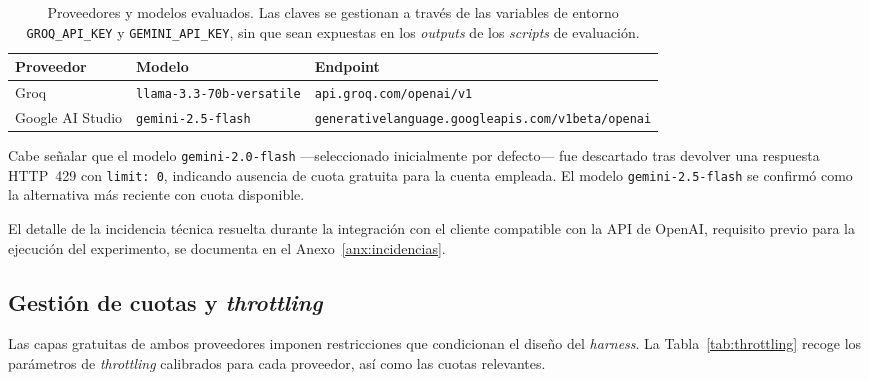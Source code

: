 \begin{table}[ht]
	\centering
	\small
	\begin{tabular}{llp{5.5cm}}
		\hline
		\textbf{Proveedor} & \textbf{Modelo}                  & \textbf{Endpoint}                                                                            \\
		\hline
		Groq               & \texttt{llama-3.3-70b-versatile} & \texttt{api.groq.com/openai/v1}                                                              \\
		Google AI Studio   & \texttt{gemini-2.5-flash}        & \texttt{generativelanguage.\allowbreak googleapis.com/\allowbreak v1beta/\allowbreak openai} \\
		\hline
	\end{tabular}
	\caption{Proveedores y modelos evaluados. Las claves se gestionan a través de
		las variables de entorno \texttt{GROQ\_API\_KEY} y \texttt{GEMINI\_API\_KEY},
		sin que sean expuestas en los \textit{outputs} de los \textit{scripts} de
		evaluación.}
	\label{tab:proveedores}
\end{table}

Cabe señalar que el modelo \texttt{gemini-2.0-flash} ---seleccionado inicialmente
por defecto--- fue descartado tras devolver una respuesta HTTP~429 con
\texttt{limit: 0}, indicando ausencia de cuota gratuita para la cuenta
empleada. El modelo \texttt{gemini-2.5-flash} se confirmó como la alternativa
más reciente con cuota disponible.

El detalle de la incidencia técnica resuelta durante la integración con el
cliente compatible con la API de OpenAI, requisito previo para la ejecución del
experimento, se documenta en el Anexo~\ref{anx:incidencias}.

\subsection{Gestión de cuotas y \textit{throttling}}

Las capas gratuitas de ambos proveedores imponen restricciones que condicionan
el diseño del \textit{harness}. La Tabla~\ref{tab:throttling} recoge los
parámetros de \textit{throttling} calibrados para cada proveedor, así como las
cuotas relevantes.

